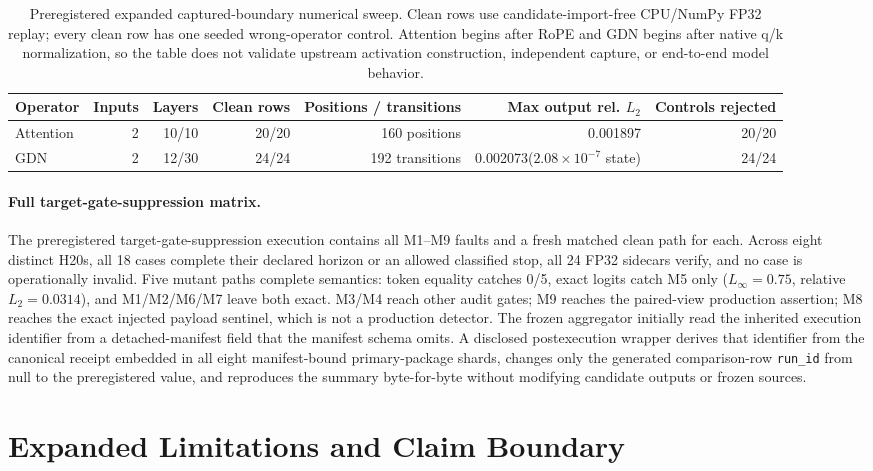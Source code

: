 \documentclass{article}
\begin{document}
\begin{table}[H]
\caption{Preregistered expanded captured-boundary numerical sweep.  Clean rows use
candidate-import-free CPU/NumPy FP32 replay; every clean row has one seeded
wrong-operator control.  Attention begins after RoPE and GDN begins after
native q/k normalization, so the table does not validate upstream activation
construction, independent capture, or end-to-end model behavior.}
\label{tab:r30-expanded-oracle}
\centering\scriptsize
\setlength{\tabcolsep}{3pt}
\begin{tabular}{@{}lrrrrrr@{}}
\toprule
Operator & Inputs & Layers & Clean rows & Positions / transitions & Max output rel. $L_2$ & Controls rejected \\
\midrule
Attention & 2 & 10/10 & 20/20 & 160 positions & 0.001897 & 20/20 \\
GDN & 2 & 12/30 & 24/24 & 192 transitions & 0.002073\;($2.08\times10^{-7}$ state) & 24/24 \\
\bottomrule
\end{tabular}
\end{table}

\paragraph{Full target-gate-suppression matrix.}
The preregistered target-gate-suppression execution contains all M1--M9 faults and a fresh matched
clean path for each.  Across eight distinct H20s, all 18 cases complete their
declared horizon or an allowed classified stop, all 24 FP32 sidecars verify,
and no case is operationally invalid.  Five mutant paths complete semantics:
token equality catches 0/5, exact logits catch M5 only
($L_\infty=0.75$, relative $L_2=0.0314$), and M1/M2/M6/M7 leave both exact.
M3/M4 reach other audit gates; M9 reaches the paired-view production assertion;
M8 reaches the exact injected payload sentinel, which is not a production
detector.  The frozen aggregator initially read the inherited execution identifier from a
detached-manifest field that the manifest schema omits.  A disclosed
postexecution wrapper derives that identifier from the canonical receipt embedded in
all eight manifest-bound primary-package shards, changes only the generated comparison-row
\texttt{run\_id} from null to the preregistered value, and reproduces the
summary byte-for-byte without modifying candidate outputs or frozen sources.

\section{Expanded Limitations and Claim Boundary}
\label{app:expanded-limitations}
\end{document}
